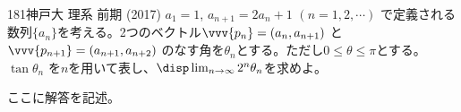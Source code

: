 \begin{prob}{181}{}{神戸大 理系 前期 (2017)}
 $a_1=1$, $a_{n+1}=2a_n+1$ $(n=1, 2, \cdots)$ で定義される数列$\{a_n\}$を考える。2つのベクトル$\vvv{p_n}=(a_n, a_{n+1})$ と$\vvv{p_{n+1}}=(a_{n+1},a_{n+2})$ のなす角を$\theta_n$とする。ただし$0\le\theta\le\pi$とする。$\tan\theta_n$ を$n$を用いて表し、$\disp \lim_{n\to\infty}2^n\theta_n$を求めよ。
\end{prob}
ここに解答を記述。